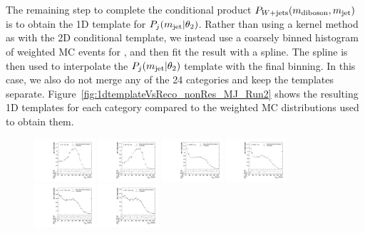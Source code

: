 The remaining step to complete the conditional product $P_{W+\text{jets}}(m_\mathrm{diboson},m_\mathrm{jet})$ is to obtain the 1D template for $P_j(m_\mathrm{jet}|\theta_2)$.
Rather than using a kernel method as with the 2D conditional template, we instead use a coarsely binned histogram of weighted MC events for \MJ, and then fit the result with a spline.
The spline is then used to interpolate the $P_j(m_\mathrm{jet}|\theta_2)$ template with the final \MJ binning.
In this case, we also do not merge any of the 24 categories and keep the templates separate.
Figure~\ref{fig:1dtemplateVsReco_nonRes_MJ_Run2} shows the resulting 1D templates for each category compared to the weighted MC distributions used to obtain them.

\begin{figure}[htbp]
  \centering
  \includegraphics[width=0.2\textwidth]{fig/2Dfit/templateVsReco_nonRes_r0_MJ_mu_HP_bb_LDy.pdf}
  \includegraphics[width=0.2\textwidth]{fig/2Dfit/templateVsReco_nonRes_r0_MJ_e_HP_bb_LDy.pdf}
  \includegraphics[width=0.2\textwidth]{fig/2Dfit/templateVsReco_nonRes_r0_MJ_mu_LP_bb_LDy.pdf}
  \includegraphics[width=0.2\textwidth]{fig/2Dfit/templateVsReco_nonRes_r0_MJ_e_LP_bb_LDy.pdf}\\
  \includegraphics[width=0.2\textwidth]{fig/2Dfit/templateVsReco_nonRes_r0_MJ_mu_HP_nobb_LDy.pdf}
  \includegraphics[width=0.2\textwidth]{fig/2Dfit/templateVsReco_nonRes_r0_MJ_e_HP_nobb_LDy.pdf}

\end{figure}
